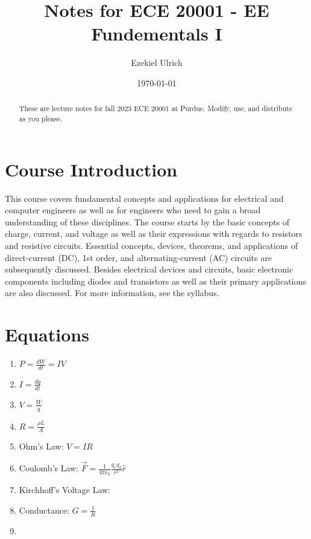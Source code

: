 \documentclass[nobib]{tufte-handout}
\title{Notes for ECE 20001 - EE Fundementals I}
\author[Ezekiel Ulrich]{Ezekiel Ulrich}
\date{\today}  %
\begin{document}
\maketitle

\begin{abstract}
These are lecture notes for fall 2023 ECE 20001 at Purdue. Modify, use, and distribute as you please.
\end{abstract}

\tableofcontents

\section{Course Introduction}

This course covers fundamental concepts and applications 
for electrical and computer engineers as well as for engineers
 who need to gain a broad understanding of these disciplines. 
 The course starts by the basic concepts of charge, current, 
 and voltage as well as their expressions with regards to 
 resistors and resistive circuits. Essential concepts, 
 devices, theorems, and applications of direct-current (DC), 
 1st order, and alternating-current (AC) circuits are 
 subsequently discussed. Besides electrical devices and 
 circuits, basic electronic components including diodes and 
 transistors as well as their primary applications are also 
 discussed. For more information, see the syllabus. 

\section{Equations}

\begin{enumerate}
    \item $P = \frac{dW}{dt} = IV$
    \item $I = \frac{dq}{dt}$
    \item $V = \frac{W}{q}$
    \item $R = \frac{\rho L}{A}$
    \item Ohm's Law: $V=IR$
    \item Coulomb's Law: $\vec{F} = \frac{1}{4\pi \epsilon_0}\frac{q_1 q_2}{r^2}\hat{r}$
    \item Kirchhoff's Voltage Law: 
    \item Conductance: $G = \frac{1}{R}$
    \item 
\end{enumerate}

\pagebreak
\end{document}
